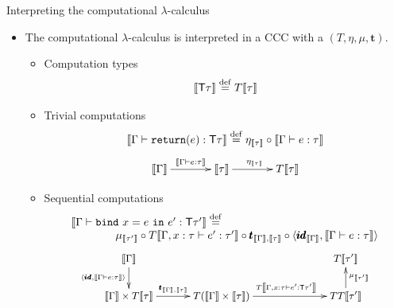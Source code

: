 \documentclass[paper=screen,mode=present,style=zysimple]{powerdot}
\begin{document}
\begin{slide}{Interpreting the computational $\lambda$-calculus}
\begin{itemize}
\item The computational $\lambda$-calculus is interpreted in a CCC with a  
  $(T, \eta, \mu, \pmb{t})$.
\begin{itemize} \small
\item Computation types
$$\Eval {\tcomp \tau} \defeq T \Eval{\tau} 
\vspace*{-1.5em}
$$
\item Trivial computations \vspace*{-0.6em}
$$
\Eval{\Gamma \vdash \cval(e) : \tcomp \tau} \defeq
\eta_{\Eval \tau} \circ \Eval{\Gamma \vdash e : \tau} 
\vspace*{-1em}
$$ 
$$
\xymatrix@+=3pc{
  \Eval \Gamma \ar[r] ^{\Eval{\Gamma \vdash e: \tau}} & \Eval \tau \ar[r]^{\eta_{\Eval \tau}} & T \Eval \tau 
}
\vspace*{-1.5em}
$$
\item Sequential computations \vspace*{-0.6em}
$$
\begin{array}{l}
{\left\llbracket{\Gamma \vdash \mathtt{bind} \ {x} = {e} \ \mathtt{in} \ {e'} : \mathsf{T}\tau'}\right\rrbracket} \stackrel{\mathrm{def}}{=} 
\\ \qquad\qquad
\mu_{{\left\llbracket{\tau'}\right\rrbracket}} \circ T {\left\llbracket{\Gamma, x: \tau \vdash e' : \tau'}\right\rrbracket} \circ \pmb{t}_{{\left\llbracket{\Gamma}\right\rrbracket}, {\left\llbracket{\tau}\right\rrbracket}}
\circ \langle{\pmb{id}_{{\left\llbracket{\Gamma}\right\rrbracket}}, {\left\llbracket{\Gamma \vdash e : \tau}\right\rrbracket}}\rangle  
\end{array}
$$
$$\small
\xymatrix@C=2.5pc@R=1.5pc{
  \Eval \Gamma \ar[d]_{\cpair{\pmb{id}, \Eval{\Gamma \vdash e: \tau}}} & & & T \Eval{\tau'} 
  \\
  \Eval \Gamma  \times T \Eval \tau \ar[r]^(.48){\pmb{t}_{\Eval \Gamma, \Eval \tau}} 
  & T (\Eval \Gamma \times \Eval \tau) \ar[rr]^(.52){T \Eval{\Gamma, x: \tau \vdash e': \tcomp \tau'}} 
  & & T T \Eval{\tau'} \ar[u]_{\mu_{\Eval{\tau'}}} 
}
$$
\end{itemize}
\end{itemize}
\end{slide}
\end{document}
